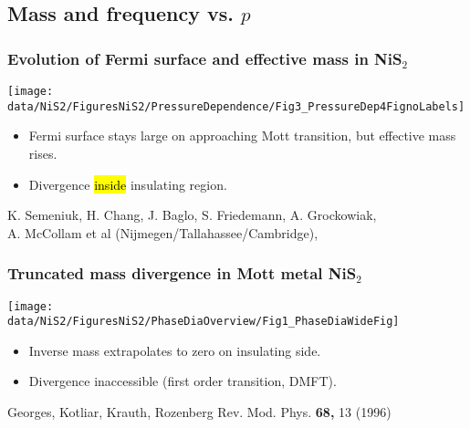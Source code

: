 \subsection{Mass and frequency vs. $p$}
\begin{frame}[label=QONiS2]
\frametitle{Evolution of Fermi surface and effective mass in NiS$_2$}
\vspace{0.5em}

\centerline{\texttt{[image: \\data/NiS2/FiguresNiS2/PressureDependence/Fig3\_PressureDep4FignoLabels]}}
\begin{itemize}
\item
Fermi surface stays large on approaching Mott transition, but
effective mass rises.
\item
Divergence \hl{inside} insulating region.
\end{itemize}

\vspace*{\fill}
\centerline{\makebox[\linewidth]{\rule{0.85\textwidth}{0.4pt}}}
\begin{center}
{\scriptsize K. Semeniuk, H. Chang, J. Baglo, S. Friedemann, A. Grockowiak, \\
A. McCollam et al (Nijmegen/Tallahassee/Cambridge),  }
\end{center}

\end{frame}


\begin{frame}[label=QONiS2-2]
  \frametitle{Truncated mass divergence in Mott metal NiS$_2$}
  
  \centerline{\texttt{[image: \\data/NiS2/FiguresNiS2/PhaseDiaOverview/Fig1\_PhaseDiaWideFig]}}
  \begin{itemize}
  \item<1->
  {Inverse mass extrapolates to zero on insulating side.}
  \item<visible@2->
  {Divergence inaccessible (first order transition, DMFT).}
  
  \end{itemize}
  
  \vspace*{\fill}
  \vspace{-0.25em}
  \centerline{\makebox[\linewidth]{\rule{0.85\textwidth}{0.4pt}}}
  \centerline{\scriptsize Georges, Kotliar, Krauth, Rozenberg
    Rev. Mod. Phys. {\bf 68,} 13 (1996)}
  \end{frame}
  
  